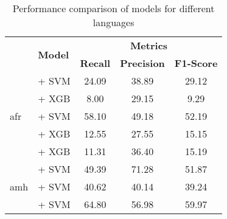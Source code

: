 \begin{longtable}{llccc}
    \centering
    \caption{Performance comparison of models for different languages}
    \label{tab:model_selection}
    \toprule
    \multirow{2}{*}{\textbf{Language}} & \multirow{2}{*}{\textbf{Model}}                                    & \multicolumn{3}{c}{\textbf{Metrics}}                                          \\
    \cmidrule(lr){3-5}
                                       &                                                                    & \textbf{Recall}                      & \textbf{Precision} & \textbf{F1-Score} \\
    \midrule
    \multirow{5}{*}{afr}               & \citep{feng2022languageagnosticbertsentenceembedding} + SVM        & 24.09                                & 38.89              & 29.12             \\
                                       & \citep{all-MiniLM-L12-v2}  + XGB                                   & 8.00                                 & 29.15              & 9.29              \\
                                       & \citep{wang2024multilingual}  + SVM                                & 58.10                                & 49.18              & 52.19             \\
                                       & \citep{zhang2025jasperstelladistillationsota}  + XGB               & 12.55                                & 27.55              & 15.15             \\
                                       & \citep{lee2024nv}  + XGB                                           & 11.31                                & 36.40              & 15.19             \\
    \midrule
    \multirow{6}{*}{amh}               & \citep{rasyosef2025bertamharic}  + SVM                             & 49.39                                & 71.28              & 51.87             \\
                                       & \citep{davlan2025bertamharic} + SVM                                & 40.62                                & 40.14              & 39.24             \\
                                       & \citep{wang2024multilingual} + SVM                                 & 64.80                                & 56.98              & 59.97             \\

\end{longtable}
